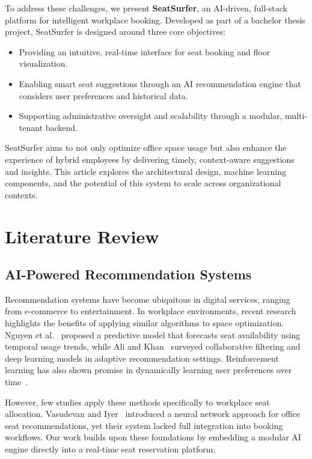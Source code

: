 \documentclass[conference]{IEEEtran}
\begin{document}
To address these challenges, we present \textbf{SeatSurfer}, an AI-driven, full-stack platform for intelligent workplace booking. Developed as part of a bachelor thesis project, SeatSurfer is designed around three core objectives:

\begin{itemize}
    \item Providing an intuitive, real-time interface for seat booking and floor visualization.
    \item Enabling smart seat suggestions through an AI recommendation engine that considers user preferences and historical data.
    \item Supporting administrative oversight and scalability through a modular, multi-tenant backend.
\end{itemize}

SeatSurfer aims to not only optimize office space usage but also enhance the experience of hybrid employees by delivering timely, context-aware suggestions and insights. This article explores the architectural design, machine learning components, and the potential of this system to scale across organizational contexts.

\section{Literature Review}

\subsection{AI-Powered Recommendation Systems}

Recommendation systems have become ubiquitous in digital services, ranging from e-commerce to entertainment. In workplace environments, recent research highlights the benefits of applying similar algorithms to space optimization. Nguyen et al.~\cite{nguyen2023predictive} proposed a predictive model that forecasts seat availability using temporal usage trends, while Ali and Khan~\cite{ali2023survey} surveyed collaborative filtering and deep learning models in adaptive recommendation settings. Reinforcement learning has also shown promise in dynamically learning user preferences over time~\cite{cai2022rl}.

However, few studies apply these methods specifically to workplace seat allocation. Vasudevan and Iyer~\cite{vasudevan2023smart} introduced a neural network approach for office seat recommendations, yet their system lacked full integration into booking workflows. Our work builds upon these foundations by embedding a modular AI engine directly into a real-time seat reservation platform.
\end{document}

